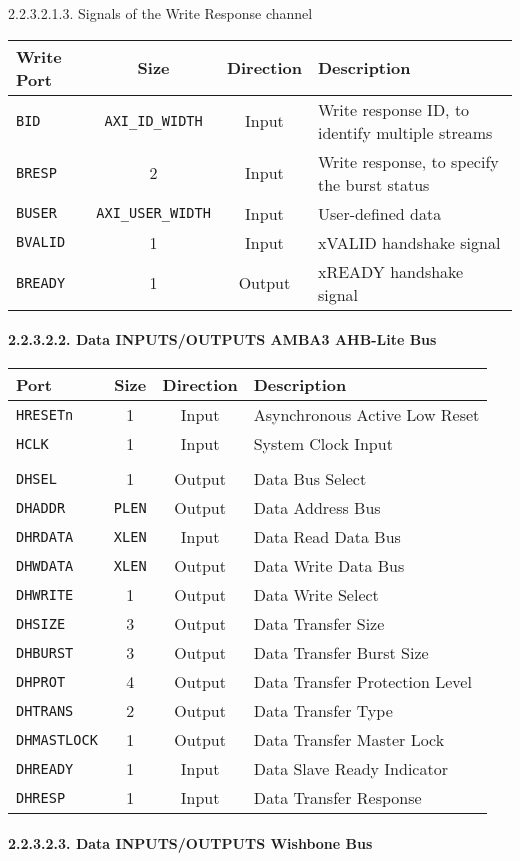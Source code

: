 \documentclass[]{article}
\let\oldparagraph\paragraph
\renewcommand{\paragraph}[1]{\oldparagraph{#1}\mbox{}}
\begin{document}
2.2.3.2.1.3. Signals of the Write Response channel

\begin{longtable}[]{@{}lccl@{}}
\toprule
Write Port & Size & Direction & Description\tabularnewline
\midrule
\endhead
\texttt{BID} & \texttt{AXI\_ID\_WIDTH} & Input & Write response ID, to
identify multiple streams\tabularnewline
\texttt{BRESP} & 2 & Input & Write response, to specify the burst
status\tabularnewline
\texttt{BUSER} & \texttt{AXI\_USER\_WIDTH} & Input & User-defined
data\tabularnewline
\texttt{BVALID} & 1 & Input & xVALID handshake signal\tabularnewline
\texttt{BREADY} & 1 & Output & xREADY handshake signal\tabularnewline
\bottomrule
\end{longtable}

\paragraph{2.2.3.2.2. Data INPUTS/OUTPUTS AMBA3 AHB-Lite
Bus}\label{data-inputsoutputs-amba3-ahb-lite-bus}

\begin{longtable}[]{@{}lccl@{}}
\toprule
Port & Size & Direction & Description\tabularnewline
\midrule
\endhead
\texttt{HRESETn} & 1 & Input & Asynchronous Active Low
Reset\tabularnewline
\texttt{HCLK} & 1 & Input & System Clock Input\tabularnewline
& & &\tabularnewline
\texttt{DHSEL} & 1 & Output & Data Bus Select\tabularnewline
\texttt{DHADDR} & \texttt{PLEN} & Output & Data Address
Bus\tabularnewline
\texttt{DHRDATA} & \texttt{XLEN} & Input & Data Read Data
Bus\tabularnewline
\texttt{DHWDATA} & \texttt{XLEN} & Output & Data Write Data
Bus\tabularnewline
\texttt{DHWRITE} & 1 & Output & Data Write Select\tabularnewline
\texttt{DHSIZE} & 3 & Output & Data Transfer Size\tabularnewline
\texttt{DHBURST} & 3 & Output & Data Transfer Burst Size\tabularnewline
\texttt{DHPROT} & 4 & Output & Data Transfer Protection
Level\tabularnewline
\texttt{DHTRANS} & 2 & Output & Data Transfer Type\tabularnewline
\texttt{DHMASTLOCK} & 1 & Output & Data Transfer Master
Lock\tabularnewline
\texttt{DHREADY} & 1 & Input & Data Slave Ready Indicator\tabularnewline
\texttt{DHRESP} & 1 & Input & Data Transfer Response\tabularnewline
\bottomrule
\end{longtable}

\paragraph{2.2.3.2.3. Data INPUTS/OUTPUTS Wishbone
Bus}\label{data-inputsoutputs-wishbone-bus}
\end{document}
